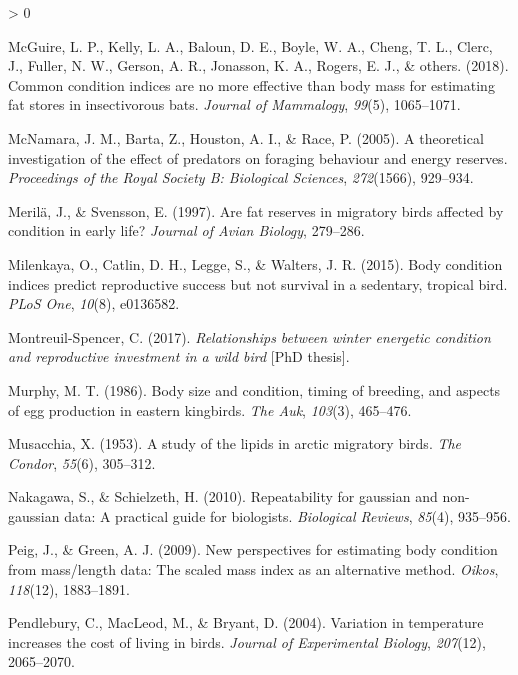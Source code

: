 \documentclass[
]{article}
\newlength{\cslhangindent}
\newenvironment{CSLReferences}[2] %
 {%
  \setlength{\parindent}{0pt}
  \ifodd #1 \everypar{\setlength{\hangindent}{\cslhangindent}}\ignorespaces\fi
  \ifnum #2 > 0
  \setlength{\parskip}{#2\baselineskip}
  \fi
 }%
 {}
\begin{document}
\begin{CSLReferences}{1}{0}
\leavevmode\hypertarget{ref-mcguire2018common}{}%
McGuire, L. P., Kelly, L. A., Baloun, D. E., Boyle, W. A., Cheng, T. L.,
Clerc, J., Fuller, N. W., Gerson, A. R., Jonasson, K. A., Rogers, E. J.,
\& others. (2018). Common condition indices are no more effective than
body mass for estimating fat stores in insectivorous bats. \emph{Journal
of Mammalogy}, \emph{99}(5), 1065--1071.

\leavevmode\hypertarget{ref-mcnamara2005theoretical}{}%
McNamara, J. M., Barta, Z., Houston, A. I., \& Race, P. (2005). A
theoretical investigation of the effect of predators on foraging
behaviour and energy reserves. \emph{Proceedings of the Royal Society B:
Biological Sciences}, \emph{272}(1566), 929--934.

\leavevmode\hypertarget{ref-merila1997fat}{}%
Merilä, J., \& Svensson, E. (1997). Are fat reserves in migratory birds
affected by condition in early life? \emph{Journal of Avian Biology},
279--286.

\leavevmode\hypertarget{ref-milenkaya2015body}{}%
Milenkaya, O., Catlin, D. H., Legge, S., \& Walters, J. R. (2015). Body
condition indices predict reproductive success but not survival in a
sedentary, tropical bird. \emph{PLoS One}, \emph{10}(8), e0136582.

\leavevmode\hypertarget{ref-montreuil2017relationships}{}%
Montreuil-Spencer, C. (2017). \emph{Relationships between winter
energetic condition and reproductive investment in a wild bird} {[}PhD
thesis{]}.

\leavevmode\hypertarget{ref-murphy1986body}{}%
Murphy, M. T. (1986). Body size and condition, timing of breeding, and
aspects of egg production in eastern kingbirds. \emph{The Auk},
\emph{103}(3), 465--476.

\leavevmode\hypertarget{ref-musacchia1953study}{}%
Musacchia, X. (1953). A study of the lipids in arctic migratory birds.
\emph{The Condor}, \emph{55}(6), 305--312.

\leavevmode\hypertarget{ref-nakagawa2010repeatability}{}%
Nakagawa, S., \& Schielzeth, H. (2010). Repeatability for gaussian and
non-gaussian data: A practical guide for biologists. \emph{Biological
Reviews}, \emph{85}(4), 935--956.

\leavevmode\hypertarget{ref-peig2009new}{}%
Peig, J., \& Green, A. J. (2009). New perspectives for estimating body
condition from mass/length data: The scaled mass index as an alternative
method. \emph{Oikos}, \emph{118}(12), 1883--1891.

\leavevmode\hypertarget{ref-pendlebury2004variation}{}%
Pendlebury, C., MacLeod, M., \& Bryant, D. (2004). Variation in
temperature increases the cost of living in birds. \emph{Journal of
Experimental Biology}, \emph{207}(12), 2065--2070.


\end{CSLReferences}
\end{document}
